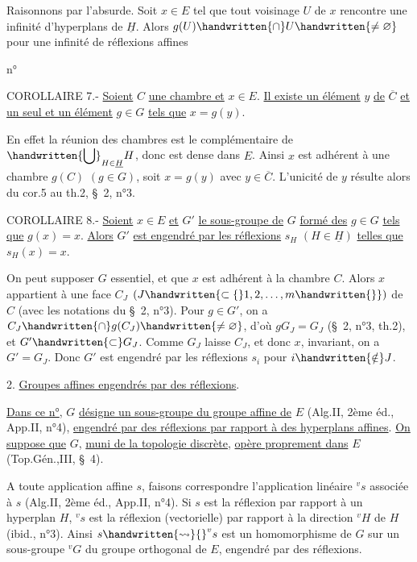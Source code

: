 Raisonnons par l'absurde. Soit $x\in E$ tel que tout voisinage $U$ de $x$ rencontre une infinité d'hyperplans de $\underline{H}$. Alors $g(U)\handwritten{\cap}U\handwritten{\ne\varnothing}$ pour une infinité de réflexions affines

\begin{flushright}n°\end{flushright}
COROLLAIRE 7.- \uline{Soient} $C$ \uline{une chambre et} $x\in E$. \uline{Il existe un élément} $y$ \uline{de} $\overline{C}$ \uline{et un seul et un élément} $g\in G$ \uline{tels que} $x=g(y)$.

En effet la réunion des chambres est le complémentaire de $\displaystyle\handwritten{\bigcup}_{H\in\underline{H}}H$, donc est dense dans $E$. Ainsi $x$ est adhérent à une chambre $g(C)$ $(g\in G)$, soit $x=g(y)$ avec $y\in\overline{C}$. L'unicité de $y$ résulte alors du cor.5 au th.2, \S\ 2, n°3.

COROLLAIRE 8.- \uline{Soient} $x\in E$ \uline{et} $G'$ \uline{le sous-groupe de} $G$ \uline{formé des} $g\in G$ \uline{tels que} $g(x)=x$. \uline{Alors} $G'$ \uline{est engendré par les réflexions} $s_H$ $(H\in\underline{H})$ \uline{telles que} $s_H(x)=x$.

On peut supposer $G$ essentiel, et que $x$ est adhérent à la chambre $C$. Alors $x$ appartient à une face $C_J$ $(J\handwritten{\subset\{}1,2,\ldots,m\handwritten{\}})$ de $C$ (avec les notations du \S\ 2, n°3). Pour $g\in G'$, on a $C_J\handwritten{\cap}g(C_J)\handwritten{\ne\varnothing}$, d'où $gG_J=G_J$ (\S\ 2, n°3, th.2), et $G'\handwritten{\subset}G_J$. Comme $G_J$ laisse $C_J$, et donc $x$, invariant, on a $G'=G_J$. Donc $G'$ est engendré par les réflexions $s_i$ pour $i\handwritten{\notin}J$.

2. \uline{Groupes affines engendrés par des réflexions}.

\uline{Dans ce n°}, $G$ \uline{désigne un sous-groupe du groupe affine de} $E$ (Alg.II, 2ème éd., App.II, n°4), \uline{engendré par des réflexions par rapport à des hyperplans affines}. \uline{On suppose que} $G$, \uline{muni de la topologie discrète}, \uline{opère proprement dans} $E$ (Top.Gén.,III, \S\ 4).

A toute application affine $s$, faisons correspondre l'application linéaire ${}^vs$ associée à $s$ (Alg.II, 2ème éd., App.II, n°4). Si $s$ est la réflexion par rapport à un hyperplan $H$, ${}^vs$ est la réflexion (vectorielle) par rapport à la direction ${}^vH$ de $H$ (ibid., n°3). Ainsi $s\handwritten{\rightsquigarrow}{}^vs$ est un homomorphisme de $G$ sur un sous-groupe ${}^vG$ du groupe orthogonal de $E$, engendré par des réflexions.

